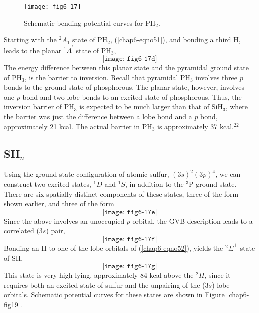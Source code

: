 \begin{figure}
\texttt{[image: fig6-17]}
\begin{center}
\caption{Schematic bending potential curves for PH$_2$.}
\end{center}
\label{chap6-fig18}
\end{figure}

Starting with the ${^2A}_1$ state of PH$_2$, (\ref{chap6-eqno51}), and
bonding a third H, leads to the planar ${^1A}^{\prime}$ state of
PH$_3$,
\begin{equation}
\texttt{[image: fig6-17d]}
\end{equation}
The energy difference between this planar state and the pyramidal 
ground state of PH$_3$, is the barrier to inversion.  Recall that pyramidal
PH$_3$ involves three $p$ bonds to the ground state of phosphorous.  The 
planar state, however, involves one $p$ bond and two lobe bonds to an 
excited state of phosphorous.  Thus, the inversion barrier of PH$_3$ is 
expected to be much larger than that of SiH$_3$, where the barrier was 
just the difference between a lobe bond and a $p$ bond, approximately 21 
kcal. The actual barrier in PH$_3$ is approximately 37 kcal.$^{22}$

\subsection{SH$_n$}

Using the ground state configuration of atomic sulfur, $(3s)^2
(3p)^4$, we can construct two excited states, ${^1D}$ and ${^1S}$, in
addition to the ${^3}$P ground state. There are six spatially distinct
components of these states, three of the form shown earlier, and three
of the form
\begin{equation}
\texttt{[image: fig6-17e]}
\end{equation}
Since the above involves an unoccupied $p$ orbital, the GVB
description leads to a correlated ($3s$) pair,
\begin{equation}
\texttt{[image: fig6-17f]}
\label{chap6-eqno52}
\end{equation}
Bonding an H to one of the lobe orbitals of (\ref{chap6-eqno52}),
yields the ${^2\Sigma}^+$ state of SH,
\begin{equation}
\texttt{[image: fig6-17g]}
\label{chap6-eqno53}
\end{equation}
This state is very high-lying, approximately 84 kcal above the 
${^2\Pi}$, since it 
requires both an excited state of sulfur and the unpairing of the 
($3s$) lobe orbitals.  Schematic potential curves for these states are 
shown in Figure \ref{chap6-fig19}.

